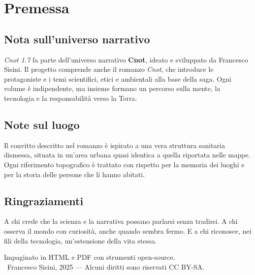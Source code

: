 \cleardoublepage
\chapter*{Premessa}

\section*{Nota sull'universo narrativo}
\textit{Cnot 1.7} fa parte dell’universo narrativo \textbf{Cnot}, ideato e sviluppato da Francesco Sisini.
Il progetto comprende anche il romanzo \textit{Cnot}, che introduce le protagoniste e i temi scientifici, etici e ambientali alla base della saga.
Ogni volume \`e indipendente, ma insieme formano un percorso sulla mente, la tecnologia e la responsabilità verso la Terra. %

\section*{Note sul luogo}
Il convitto descritto nel romanzo \`e ispirato a una vera struttura sanitaria dismessa, situata in un’area urbana quasi identica a quella riportata nelle mappe.
Ogni riferimento topografico \`e trattato con rispetto per la memoria dei luoghi e per la storia delle persone che li hanno abitati. %

\section*{Ringraziamenti}
A chi crede che la scienza e la narrativa possano parlarsi senza tradirsi.
A chi osserva il mondo con curiosità, anche quando sembra fermo.
E a chi riconosce, nei fili della tecnologia, un’estensione della vita stessa. %

\vspace{2em}
\begin{center}
\footnotesize
Impaginato in HTML e PDF con strumenti open-source.\\
\textcopyright\ Francesco Sisini, 2025 — Alcuni diritti sono riservati CC BY-SA.
\end{center}
